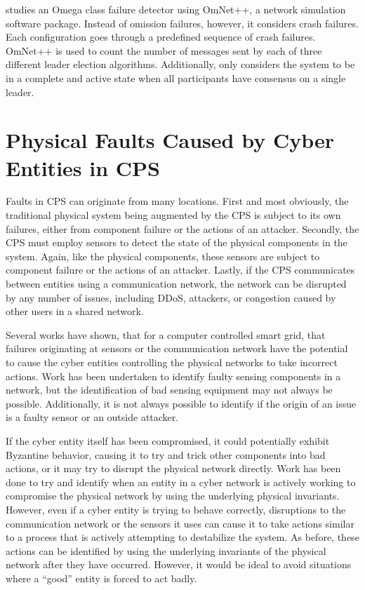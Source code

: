 \cite{LEADERELECTIONEVAL} studies an Omega class failure detector using OmNet++\cite{OMNET}, a network simulation software package. Instead of omission failures, however, it considers crash failures. Each configuration goes through a predefined sequence of crash failures. OmNet++ is used to count the number of messages sent by each of three different leader election algorithms. Additionally, \cite{LEADERELECTIONEVAL} only considers the system to be in a complete and active state when all participants have consensus on a single leader.

\section{Physical Faults Caused by Cyber Entities in CPS}

Faults in \ac{CPS} can originate from many locations.
First and most obviously, the traditional physical system being augmented by the CPS is subject to its own failures, either from component failure or the actions of an attacker.
Secondly, the \ac{CPS} must employ sensors to detect the state of the physical components in the system.
Again, like the physical components, these sensors are subject to component failure or the actions of an attacker.
Lastly, if the \ac{CPS} communicates between entities using a communication network, the network can be disrupted by any number of issues, including DDoS, attackers, or congestion caused by other users in a shared network.

Several works have shown, that for a computer controlled smart grid, that failures originating at sensors or the communication network have the potential to cause the cyber entities controlling the physical networks to take incorrect actions.
Work has been undertaken to identify faulty sensing components in a network, but the identification of bad sensing equipment may not always be possible.
Additionally, it is not always possible to identify if the origin of an issue is a faulty sensor or an outside attacker.

If the cyber entity itself has been compromised, it could potentially exhibit Byzantine behavior, causing it to try and trick other components into bad actions, or it may try to disrupt the physical network directly.
Work has been done to try and identify when an entity in a cyber network is actively working to compromise the physical network by using the underlying physical invariants.
However, even if a cyber entity is trying to behave correctly, disruptions to the communication network or the sensors it uses can cause it to take actions similar to a process that is actively attempting to destabilize the system.
As before, these actions can be identified by using the underlying invariants of the physical network after they have occurred.
However, it would be ideal to avoid situations where a ``good'' entity is forced to act badly.

